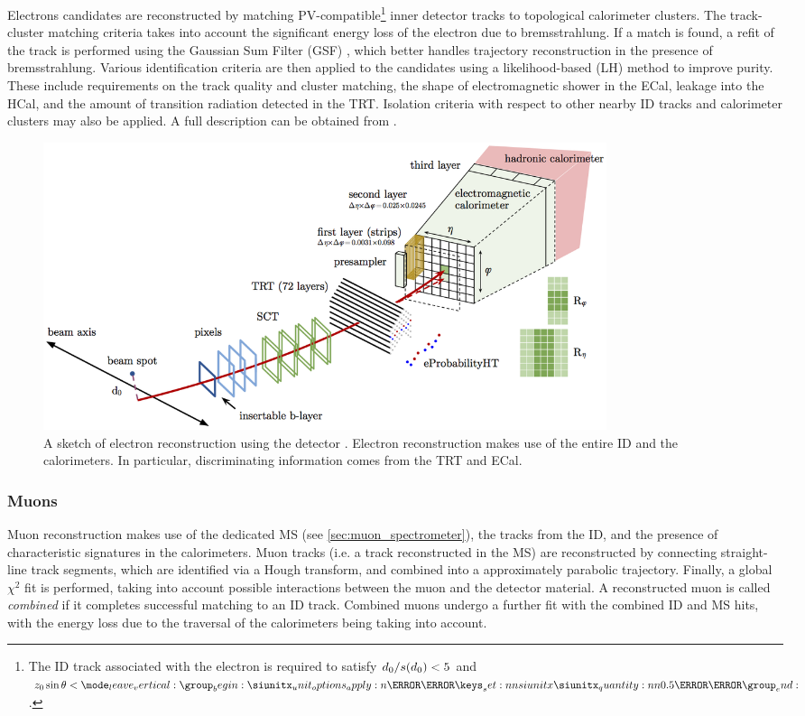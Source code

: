 Electrons candidates are reconstructed by matching PV-compatible\footnote{The ID track associated with the electron is required to satisfy $d_{0} / s(d_0) < 5$ and $\zzero\sin\theta < \SI{0.5}{\milli\meter}$.} inner detector tracks to topological calorimeter clusters.
The track-cluster matching criteria takes into account the significant energy loss of the electron due to bremsstrahlung.
If a match is found, a refit of the track is performed using the Gaussian Sum Filter (GSF) \cite{ATLAS-CONF-2012-047}, which better handles trajectory reconstruction in the presence of bremsstrahlung.
Various identification criteria are then applied to the candidates using a likelihood-based (LH) method to improve purity.
These include requirements on the track quality and cluster matching, the shape of electromagnetic shower in the ECal, leakage into the HCal, and the amount of transition radiation detected in the TRT.
Isolation criteria with respect to other nearby ID tracks and calorimeter clusters may also be applied.
A full description can be obtained from .
%
\begin{figure}[!htbp]
  \centering
  \includegraphics[width=0.8\textwidth]{chapters/2.detector/figs/electron_reco.png}
  \caption{
    A sketch of electron reconstruction using the \ATLAS detector \cite{ATLAS-CONF-2016-024}.
    Electron reconstruction makes use of the entire ID and the calorimeters.
    In particular, discriminating information comes from the TRT and ECal.
  }
  \label{fig:electron_Reco}
\end{figure}
%


\subsubsection{Muons}
Muon reconstruction makes use of the dedicated MS (see \cref{sec:muon_spectrometer}), the tracks from the ID, and the presence of characteristic signatures in the calorimeters.
Muon tracks (i.e. a track reconstructed in the MS) are reconstructed by connecting straight-line track segments, which are identified via a Hough transform, and combined into a approximately parabolic trajectory.
Finally, a global $\chi^2$ fit is performed, taking into account possible interactions between the muon and the detector material.
A reconstructed muon is called \textit{combined} if it completes successful matching to an ID track.
Combined muons undergo a further fit with the combined ID and MS hits, with the energy loss due to the traversal of the calorimeters being taking into account.

